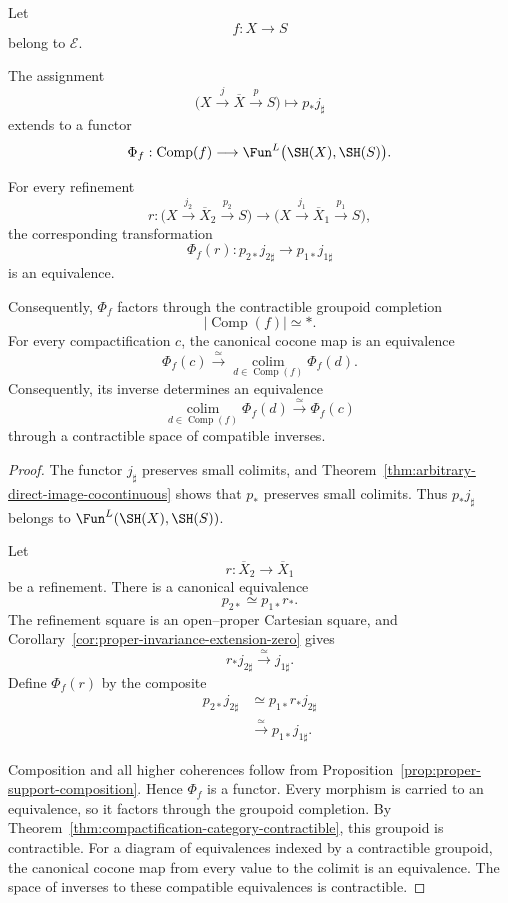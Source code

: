 \begin{proposition}
\label{prop:compactification-direct-image-diagram}
Let
\[
    f:X\longrightarrow S
\]
belong to \(\mathcal E\).

The assignment
\[
    \bigl(
      X\xrightarrow{j}\overline X\xrightarrow{p}S
    \bigr)
    \longmapsto
    p_*j_\sharp
\]
extends to a functor
\[
    \Phi_f:
    \operatorname{Comp}(f)
    \longrightarrow
    \Fun^L
    \bigl(
      \SH(X),
      \SH(S)
    \bigr).
\]

For every refinement
\[
    r:
    \bigl(
      X\xrightarrow{j_2}\overline X_2\xrightarrow{p_2}S
    \bigr)
    \longrightarrow
    \bigl(
      X\xrightarrow{j_1}\overline X_1\xrightarrow{p_1}S
    \bigr),
\]
the corresponding transformation
\[
    \Phi_f(r):
    p_{2*}j_{2\sharp}
    \longrightarrow
    p_{1*}j_{1\sharp}
\]
is an equivalence.

Consequently, \(\Phi_f\) factors through the contractible groupoid
completion
\[
    \bigl|
      \operatorname{Comp}(f)
    \bigr|
    \simeq
    *.
\]
For every compactification \(c\), the canonical cocone map is an
equivalence
\[
    \Phi_f(c)
    \xrightarrow{\simeq}
    \operatorname*{colim}_{d\in\operatorname{Comp}(f)}
    \Phi_f(d).
\]
Consequently, its inverse determines an equivalence
\[
    \operatorname*{colim}_{d\in\operatorname{Comp}(f)}
    \Phi_f(d)
    \xrightarrow{\simeq}
    \Phi_f(c)
\]
through a contractible space of compatible inverses.
\end{proposition}

\begin{proof}
The functor \(j_\sharp\) preserves small colimits, and
Theorem~\ref{thm:arbitrary-direct-image-cocontinuous} shows that \(p_*\)
preserves small colimits.  Thus \(p_*j_\sharp\) belongs to
\(\Fun^L(\SH(X),\SH(S))\).

Let
\[
    r:\overline X_2\longrightarrow\overline X_1
\]
be a refinement.  There is a canonical equivalence
\[
    p_{2*}
    \simeq
    p_{1*}r_*.
\]
The refinement square is an open--proper Cartesian square, and
Corollary~\ref{cor:proper-invariance-extension-zero} gives
\[
    r_*j_{2\sharp}
    \xrightarrow{\simeq}
    j_{1\sharp}.
\]
Define \(\Phi_f(r)\) by the composite
\[
\begin{aligned}
    p_{2*}j_{2\sharp}
    &\simeq
    p_{1*}r_*j_{2\sharp} \\
    &\xrightarrow{\simeq}
    p_{1*}j_{1\sharp}.
\end{aligned}
\]

Composition and all higher coherences follow from
Proposition~\ref{prop:proper-support-composition}.  Hence \(\Phi_f\) is a
functor.  Every morphism is carried to an equivalence, so it factors through
the groupoid completion.  By
Theorem~\ref{thm:compactification-category-contractible}, this groupoid is
contractible.  For a diagram of equivalences indexed by a contractible groupoid, the
canonical cocone map from every value to the colimit is an equivalence.  The
space of inverses to these compatible equivalences is contractible.
\end{proof}

